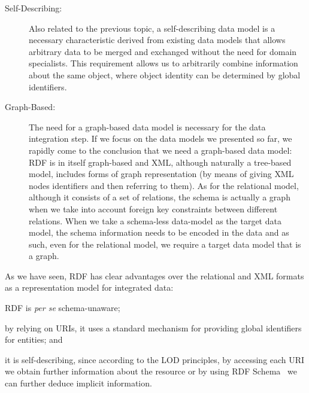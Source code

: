 \begin{description}
\item[Self-Describing:] Also related to the previous topic, a self-describing data model is a necessary characteristic
  derived from existing \sd data models that allows arbitrary data to be merged and exchanged without the need for
  domain specialists.
  This requirement allows us to arbitrarily combine information about the same object, where object identity can be
  determined by global identifiers.


\item[Graph-Based:] The need for a graph-based data model is necessary for the data integration step.  If we focus on
  the data models we presented so far, we rapidly come to the conclusion that we need a graph-based data model: \ac{RDF}
  is in itself graph-based and \ac{XML}, although naturally a tree-based model, includes forms of graph representation
  (by means of giving \ac{XML} nodes identifiers and then referring to them).
  As for the relational model, although it consists of a set of relations, the schema is actually a graph when we take
  into account foreign key constraints between different relations.  When we take a schema-less data-model as the target
  data model, the schema information needs to be encoded in the data and as such, even for the relational model, we
  require a target data model that is a graph.

\end{description}
%



As we have seen, \ac{RDF} has clear advantages over the relational and \ac{XML} formats as a representation model for
integrated data:
%
\begin{inparaenum}[(i)]
\item \ac{RDF} is \textit{per se} schema-unaware; 
\item by relying on \acp{URI}, it uses a standard mechanism for providing global identifiers for entities; and
\item it is self-describing, since according to the \ac{LOD} principles, by accessing each \ac{URI} we obtain further
  information about the resource or by using \ac{RDF} Schema~\cite{BrickleyGuha:2004aa} we can further deduce implicit
  information.
\end{inparaenum}


